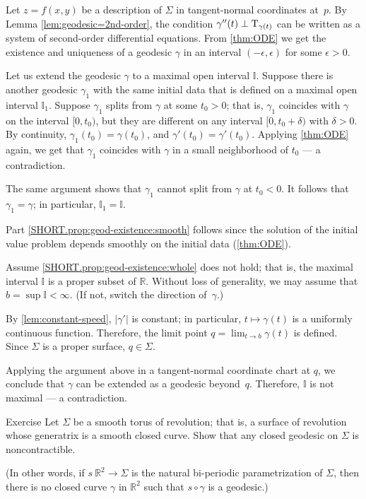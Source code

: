 Let $z=f(x,y)$ be a description of $\Sigma$ in tangent-normal coordinates at~$p$.
By Lemma \ref{lem:geodesic=2nd-order}, the condition $\gamma''(t)\perp\mathrm{T}_{\gamma(t)}$ can be written as a system of second-order differential equations.
From \ref{thm:ODE} we get the existence and uniqueness of a geodesic $\gamma$ in an interval $(-\epsilon,\epsilon)$ for some $\epsilon>0$.

Let us extend the geodesic $\gamma$ to a maximal open interval $\mathbb{I}$.
Suppose there is another geodesic $\gamma_1$ with the same initial data that is defined on a maximal open interval $\mathbb{I}_1$.
Suppose $\gamma_1$ splits from $\gamma$ at some $t_0>0$;
that is, $\gamma_1$ coincides with $\gamma$ on the interval $[0,t_0)$, but they are different on any interval $[0,t_0+\delta)$ with $\delta>0$.
By continuity, $\gamma_1(t_0)=\gamma(t_0)$, and $\gamma'(t_0)=\gamma'(t_0)$.
Applying \ref{thm:ODE} again, we get that $\gamma_1$ coincides with $\gamma$ in a small neighborhood of $t_0$ --- a contradiction.

The same argument shows that $\gamma_1$ cannot split from $\gamma$ at $t_0<0$.
It follows that $\gamma_1=\gamma$;
in particular, $\mathbb{I}_1=\mathbb{I}$.

Part \ref{SHORT.prop:geod-existence:smooth} follows since the solution of the initial value problem depends smoothly on the initial data (\ref{thm:ODE}).

Assume \ref{SHORT.prop:geod-existence:whole} does not hold;
that is, the maximal interval $\mathbb{I}$ is a proper subset of $\mathbb{R}$.
Without loss of generality, we may assume that $b=\sup\mathbb{I}<\infty$.
(If not, switch the direction of~$\gamma$.)

By \ref{lem:constant-speed}, $|\gamma'|$ is constant; in particular, $t\mapsto \gamma(t)$ is a uniformly continuous function.
Therefore, the limit point
$q=\lim_{t\to b}\gamma(t)$
is defined.
Since $\Sigma$ is a proper surface, $q\in \Sigma$. 

Applying the argument above in a tangent-normal coordinate chart at $q$, we conclude that $\gamma$ can be extended as a geodesic beyond~$q$.
Therefore, $\mathbb{I}$ is not maximal --- a contradiction.
\qeds

\begin{thm}{Exercise}\label{ex:round-torus}
Let $\Sigma$ be a smooth torus of revolution; that is,
a surface of revolution whose generatrix is a smooth closed curve.
Show that any closed geodesic on $\Sigma$ is noncontractible.

(In other words, if $s\:\mathbb{R}^2\to \Sigma$ is the natural bi-periodic parametrization of $\Sigma$, then
there is no closed curve $\gamma$ in $\mathbb{R}^2$ such that $s\circ\gamma$ is a geodesic.)
\end{thm}


